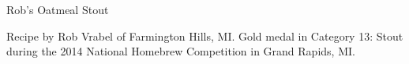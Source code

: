\begin{recipe}{Rob's Oatmeal Stout}

\begin{aboutblock}
Recipe by Rob Vrabel of Farmington Hills, MI. Gold medal in Category 13: Stout
during the 2014 National Homebrew Competition in Grand Rapids, MI. \sourceaha
\end{aboutblock}


\begin{methodandtiming}

\begin{mashsteps}
\end{mashsteps}

\begin{fermentationsteps}
\end{fermentationsteps}

\end{methodandtiming}

\recipebreak

\begin{ingredientsblock}

\begin{malts}
\end{malts}

\begin{hops}
\end{hops}


\end{ingredientsblock}

\end{recipe}

